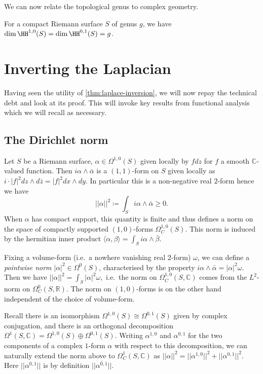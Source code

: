 We can now relate the topological genus to complex geometry.

\begin{corollary}
    For a compact Riemann surface \(S\) of genus \(g\), we have
    \(\textnormal{dim}\,\HH^{1,0}(S)=\textnormal{dim}\,\HH^{0,1}(S)=g\).
\end{corollary}

\section{Inverting the Laplacian}
 Having seen the utility of
\cref{thm:laplace-inversion}, we will now repay the technical debt and look at
its proof. This will invoke key results from functional analysis which we will
recall as necessary.

\subsection{The Dirichlet norm} Let \(S\) be a Riemann surface,
\(\alpha\in \Omega^{1,0}(S)\) given locally by \(fdz\) for \(f\) a smooth
\(\mathbb{C}\)-valued function. Then \(i\alpha \wedge \bar\alpha\) is a
\((1,1)\)-form on \(S\) given locally as \(i\cdot |f|^2
dz\wedge d \bar z = |f|^2dx\wedge dy\). In particular this is a non-negative
real \(2\)-form hence we have \[||\alpha||^2 \coloneq \int_S i\alpha \wedge
\bar\alpha \geq 0.\] When \(\alpha\) has compact support, this quantity is
finite and thus defines a norm on the space of compactly supported
\((1,0)\)-forms \(\Omega^{1,0}_C(S)\). This norm is induced by the hermitian
inner product \(\langle \alpha,\beta \rangle = \int_S i \alpha \wedge \bar
\beta.\)

Fixing a volume-form (i.e.\ a nowhere vanishing real \(2\)-form) \(\omega\), we
can define a \textit{pointwise norm} \(|\alpha|^2\in \Omega^0(S)\),
characterised by the property \(i\alpha \wedge \bar \alpha = |\alpha|^2
\omega\). Then we have \(||\alpha||^2=\int_S |\alpha|^2 \omega,\) i.e.\ the norm
on \(\Omega^{1,0}_C(S,\mathbb{C})\) comes from the \(L^2\)-norm on
\(\Omega^0_C(S,\mathbb{R})\).  The norm on \((1,0)\)-forms is on the other hand
independent of the choice of volume-form.

Recall there is an isomorphism \(\Omega^{1,0}(S)\cong \Omega^{0,1}(S)\) given by
complex conjugation, and there is an orthogonal decomposition
\(\Omega^{1}(S,\mathbb{C})=\Omega^{1,0}(S)\oplus \Omega^{0,1}(S)\). Writing
\(\alpha^{1,0}\) and \(\alpha^{0,1}\) for the two components of a complex
\(1\)-form \(\alpha\) with respect to this decomposition, we can naturally
extend the norm above to \(\Omega^1_C(S,\mathbb{C})\) as \(||\alpha||^2 =
||\alpha^{1,0}||^2+||\alpha^{0,1}||^2\). Here \(||\alpha^{0,1}||\) is by
definition \(||\overline{\alpha^{0,1}}||\).

